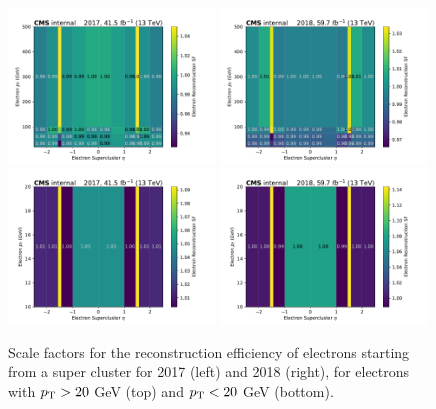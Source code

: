 \begin{figure}[ht!]
  \begin{center}
    \includegraphics[width=0.49\textwidth]{ScaleFactors/Electron/electron_reco_2017.pdf}
    \includegraphics[width=0.49\textwidth]{ScaleFactors/Electron/electron_reco_2018.pdf} \\
    \includegraphics[width=0.49\textwidth]{ScaleFactors/Electron/electron_reco_ptbelow20_2017.pdf}
    \includegraphics[width=0.49\textwidth]{ScaleFactors/Electron/electron_reco_ptbelow20_2018.pdf}

    \caption{
      Scale factors for the reconstruction efficiency of electrons starting from a super cluster for 2017 (left) and 2018 (right), for electrons with
      $p_{\textrm{T}} > 20$ GeV (top) and $p_{\textrm{T}} < 20$ GeV (bottom).
    }
    \label{fig:sf_electron_reco}
  \end{center}
\end{figure}

